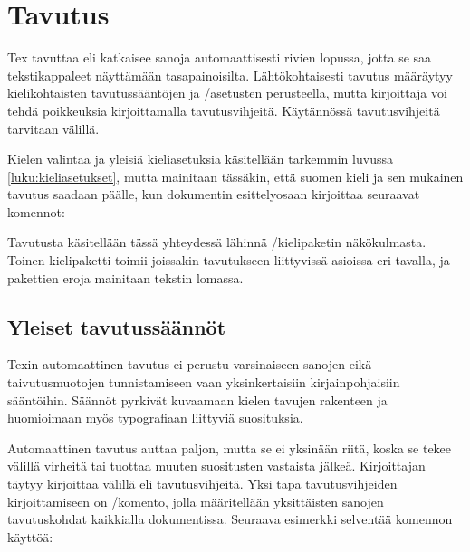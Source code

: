 \section{Tavutus}
\label{luku:tavutus}

Tex tavuttaa eli katkaisee sanoja automaattisesti rivien lopussa, jotta
se saa tekstikappaleet näyttämään tasapainoisilta. Lähtökohtaisesti
tavutus määräytyy kielikohtaisten tavutussääntöjen ja \=/asetusten
perusteella, mutta kirjoittaja voi tehdä poikkeuksia kirjoittamalla
tavutusvihjeitä. Käytännössä tavutusvihjeitä tarvitaan välillä.

Kielen valintaa ja yleisiä kieliasetuksia käsitellään tarkemmin luvussa
\ref{luku:kieliasetukset}, mutta mainitaan tässäkin, että suomen kieli
ja sen mukainen tavutus saadaan päälle, kun dokumentin esittelyosaan
kirjoittaa seuraavat komennot:

\begin{koodilohkosis}
  \usepackage{polyglossia}
  \setdefaultlanguage{finnish}
\end{koodilohkosis}

Tavutusta käsitellään tässä yhteydessä lähinnä
\-/kielipaketin näkökulmasta. Toinen kielipaketti
 toimii joissakin tavutukseen liittyvissä asioissa eri
tavalla, ja pakettien eroja mainitaan tekstin lomassa.

\subsection{Yleiset tavutussäännöt}

Texin automaattinen tavutus ei perustu varsinaiseen sanojen eikä
taivutusmuotojen tunnistamiseen vaan yksinkertaisiin kirjainpohjaisiin
sääntöihin. Säännöt pyrkivät kuvaamaan kielen tavujen rakenteen ja
huomioimaan myös typografiaan liittyviä suosituksia.

Automaattinen tavutus auttaa paljon, mutta se ei yksinään riitä, koska
se tekee välillä virheitä tai tuottaa muuten suositusten vastaista
jälkeä. Kirjoittajan täytyy kirjoittaa välillä eli tavutusvihjeitä. Yksi
tapa tavutusvihjeiden kirjoittamiseen on \-/komento, jolla määritellään yksittäisten sanojen
tavutuskohdat kaikkialla dokumentissa. Seuraava esimerkki selventää
komennon käyttöä:

\begin{koodilohkosis}
\end{koodilohkosis}

